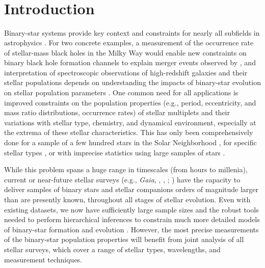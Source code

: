 \documentclass[modern]{aastex63}
\begin{document}

\section*{~}\clearpage
\section{Introduction} \label{sec:intro}

Binary-star systems provide key context and constraints for nearly all subfields
in astrophysics \citep[e.g.,][]{Breivik:BAAS, Rix:BAAS}.
For two concrete examples, a measurement of the occurrence rate of stellar-mass
black holes in the Milky Way would enable new constraints on binary black hole
formation channels to explain merger events observed by 
\citep{LIGO:BH1, LIGO:catalog}, and interpretation of spectroscopic observations
of high-redshift galaxies and their stellar populations depends on understanding
the impacts of binary-star evolution on stellar population parameters
\cite[e.g.,][]{Eldridge:2017}.
One common need for all applications is improved constraints on the population
properties (e.g., period, eccentricity, and mass ratio distributions, occurrence
rates) of stellar multiplets and their variations with stellar type, chemistry,
and dynamical environment, especially at the extrema of these stellar
characteristics.
This has only been comprehensively done for a sample of a few hundred stars in
the Solar Neighborhood \citep{Raghavan:2010}, for specific stellar types
\citep[e.g.,][]{Moe:2017}, or with imprecise statistics using large samples of
stars \citep{Badenes:2018}.

While this problem spans a huge range in timescales (from hours to millenia),
current or near-future stellar surveys (e.g., \textit{Gaia}, \apogee,
, ; \citealt{Gaia-Collaboration:2016,
Gaia-Collaboration:2018, Majewski:2017, Zhao:2012, Kollmeier:2017}) have the
capacity to deliver samples of binary stars and stellar companions orders of
magnitude larger than are presently known, throughout all stages of stellar
evolution.
Even with existing datasets, we now have sufficiently large sample sizes and the
robust tools needed to perform hierarchical inferences to constrain much more
detailed models of binary-star formation and evolution \citep[e.g.,][]{Moe:2018,
El-Badry:2019a}.
However, the most precise measurements of the binary-star population properties
will benefit from joint analysis of all stellar surveys, which cover a range of
stellar types, wavelengths, and measurement techniques.
\end{document}
